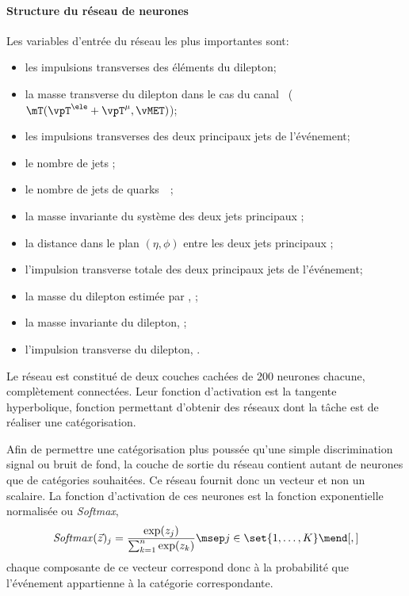 \paragraph{Structure du réseau de neurones}
Les variables d'entrée du réseau les plus importantes sont:
\begin{itemize}
\item les impulsions transverses des éléments du dilepton;
\item la masse transverse du dilepton dans le cas du canal \ele\mu\ ($\mT(\vpT^{\ele}+\vpT^{\mu},\vMET)$);
\item les impulsions transverses des deux principaux jets de l'événement;
\item le nombre de jets \Njets;
\item le nombre de jets de quarks~\quarkb\ \Nbjets;
\item la masse invariante du système des deux jets principaux \mjj;
\item la distance dans le plan $(\eta,\phi)$ entre les deux jets principaux \Detajj;
\item l'impulsion transverse totale des deux principaux jets de l'événement;
\item la masse du dilepton estimée par \SVFIT, \msv;
\item la masse invariante du dilepton, \mvis;
\item l'impulsion transverse du dilepton, \pTvis.
\end{itemize}
Le réseau est constitué de deux couches cachées de 200 neurones chacune, complètement connectées.
Leur fonction d'activation est la tangente hyperbolique, fonction permettant d'obtenir des réseaux dont la tâche est de réaliser une catégorisation.
\par
Afin de permettre une catégorisation plus poussée qu'une simple discrimination signal ou bruit de fond, la couche de sortie du réseau contient autant de neurones que de catégories souhaitées.
Ce réseau fournit donc un vecteur et non un scalaire.
La fonction d'activation de ces neurones est la fonction exponentielle normalisée ou \emph{Softmax},
\begin{equation}
\mathit{Softmax}(\vec{z})_j = \frac{\exp(z_j)}{\sum_{k=1}^n \exp(z_k)}
\msep
j\in\set{1,\ldots,K}
\mend[,]
\end{equation}
chaque composante de ce vecteur correspond donc à la probabilité que l'événement appartienne à la catégorie correspondante.
